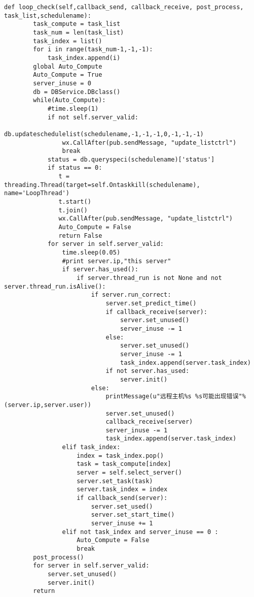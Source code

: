\begin{lstlisting}
def loop_check(self,callback_send, callback_receive, post_process, task_list,schedulename):
        task_compute = task_list
        task_num = len(task_list)
        task_index = list()
        for i in range(task_num-1,-1,-1):
            task_index.append(i)
        global Auto_Compute     
        Auto_Compute = True 
        server_inuse = 0
        db = DBService.DBclass()
        while(Auto_Compute):
            #time.sleep(1)  
            if not self.server_valid:
                db.updateschedulelist(schedulename,-1,-1,-1,0,-1,-1,-1)
                wx.CallAfter(pub.sendMessage, "update_listctrl")
                break
            status = db.queryspeci(schedulename)['status']
            if status == 0:
               t = threading.Thread(target=self.Ontaskkill(schedulename), name='LoopThread')
               t.start()
               t.join()
               wx.CallAfter(pub.sendMessage, "update_listctrl")
               Auto_Compute = False
               return False
            for server in self.server_valid:
                time.sleep(0.05)  
                #print server.ip,"this server"
                if server.has_used():  
                    if server.thread_run is not None and not server.thread_run.isAlive():
                        if server.run_correct:  
                            server.set_predict_time()
                            if callback_receive(server):  
                                server.set_unused()
                                server_inuse -= 1
                            else:
                                server.set_unused()
                                server_inuse -= 1
                                task_index.append(server.task_index)
                            if not server.has_used:
                                server.init()
                        else: 
                            printMessage(u"远程主机%s %s可能出现错误"%(server.ip,server.user))
                            server.set_unused()
                            callback_receive(server)
                            server_inuse -= 1 
                            task_index.append(server.task_index)
                elif task_index:
                    index = task_index.pop()
                    task = task_compute[index]
                    server = self.select_server()
                    server.set_task(task)
                    server.task_index = index
                    if callback_send(server):  
                        server.set_used()
                        server.set_start_time()
                        server_inuse += 1
                elif not task_index and server_inuse == 0 :
                    Auto_Compute = False
                    break
        post_process()
        for server in self.server_valid:
            server.set_unused()
            server.init()
        return
\end{lstlisting}

